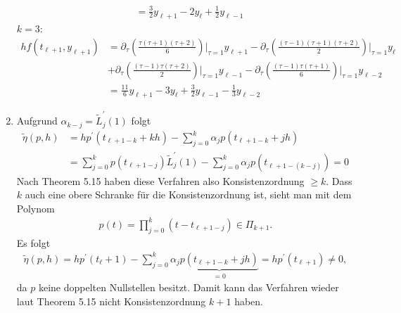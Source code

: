 \begin{solution}
\begin{enumerate}[label = \textbf{\alph*)}]
\begin{align*}
  &= \frac{3}{2}y_{\ell + 1} - 2y_{\ell} + \frac{1}{2}y_{\ell - 1}
  \end{align*}
  $k = 3$:
  \begin{align*}
  hf(t_{\ell + 1},y_{\ell + 1}) &= \partial_{\tau}\left(\frac{\tau(\tau + 1)(\tau + 2)}{6}\right)
  \Bigg|_{\tau = 1}y_{\ell + 1} -
  \partial_{\tau}\left(\frac{(\tau - 1)(\tau + 1)(\tau + 2)}{2}\right)
  \Bigg|_{\tau = 1}y_{\ell} \\
  &+ \partial_{\tau}\left(\frac{(\tau - 1)\tau(\tau + 2)}{2}\right)
  \Bigg|_{\tau = 1}y_{\ell - 1} -
  \partial_{\tau}\left(\frac{(\tau - 1)\tau(\tau + 1)}{6}\right)
  \Bigg|_{\tau = 1}y_{\ell - 2}
  \\
  &= \frac{11}{6}y_{\ell + 1} - 3y_{\ell} + \frac{3}{2}y_{\ell - 1} - \frac{1}{3}y_{\ell - 2}
  \end{align*}
  \item Aufgrund $\alpha_{k-j} = \tilde{L}_j^{\prime}(1)$ folgt
  \begin{align*}
    \tilde{\eta}(p,h) &= hp^{\prime}(t_{\ell + 1 - k} + kh)
    - \sum_{j = 0}^k \alpha_jp(t_{\ell + 1 - k} + jh) \\
    &= \sum_{j= 0}^k p(t_{\ell + 1 - j})\tilde{L}_j^{\prime}(1)
    - \sum_{j = 0}^k \alpha_jp(t_{\ell + 1 - (k - j)}) = 0
  \end{align*}
  Nach Theorem 5.15 haben diese Verfahren also Konsistenzordnung $\geq k$.
  Dass $k$ auch eine obere Schranke für die Konsistenzordnung ist, sieht man mit
  dem Polynom
  \begin{align*}
    p(t) = \prod_{j = 0}^k (t- t_{\ell + 1 - j}) \in \Pi_{k+1}.
  \end{align*}
  Es folgt
  \begin{align*}
    \tilde{\eta}(p,h) = hp^{\prime}(t_\ell + 1) - \sum_{j = 0}^k \alpha_j \underbrace{p(t_{\ell + 1 -k} + jh)}_{=0}
    = hp^{\prime}(t_{\ell + 1}) \neq 0,
  \end{align*}
  da $p$ keine doppelten Nullstellen besitzt.
  Damit kann das Verfahren wieder laut Theorem 5.15 nicht Konsistenzordnung $k + 1$ haben.
\end{enumerate}
\end{solution}
